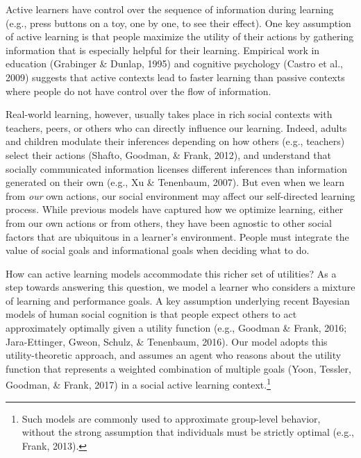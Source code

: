 \documentclass[10pt, letterpaper]{article}
\begin{document}
Active learners have control over the sequence of information during
learning (e.g., press buttons on a toy, one by one, to see their
effect). One key assumption of active learning is that people maximize
the utility of their actions by gathering information that is especially
helpful for their learning. Empirical work in education (Grabinger \&
Dunlap, 1995) and cognitive psychology (Castro et al., 2009) suggests
that active contexts lead to faster learning than passive contexts where
people do not have control over the flow of information.

Real-world learning, however, usually takes place in rich social
contexts with teachers, peers, or others who can directly influence our
learning. Indeed, adults and children modulate their inferences
depending on how others (e.g., teachers) select their actions (Shafto,
Goodman, \& Frank, 2012), and understand that socially communicated
information licenses different inferences than information generated on
their own (e.g., Xu \& Tenenbaum, 2007). But even when we learn from
\emph{our} own actions, our social environment may affect our
self-directed learning process. While previous models have captured how
we optimize learning, either from our own actions or from others, they
have been agnostic to other social factors that are ubiquitous in a
learner's environment. People must integrate the value of social goals
and informational goals when deciding what to do.

How can active learning models accommodate this richer set of utilities?
As a step towards answering this question, we model a learner who
considers a mixture of learning and performance goals. A key assumption
underlying recent Bayesian models of human social cognition is that
people expect others to act approximately optimally given a utility
function (e.g., Goodman \& Frank, 2016; Jara-Ettinger, Gweon, Schulz, \&
Tenenbaum, 2016). Our model adopts this utility-theoretic approach, and
assumes an agent who reasons about the utility function that represents
a weighted combination of multiple goals (Yoon, Tessler, Goodman, \&
Frank, 2017) in a social active learning context.\footnote{Such models
  are commonly used to approximate group-level behavior, without the
  strong assumption that individuals must be strictly optimal (e.g.,
  Frank, 2013).}
\end{document}
